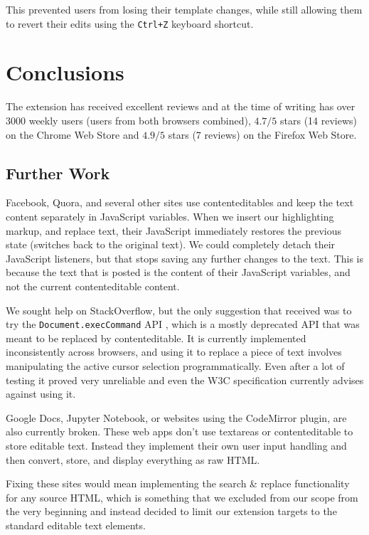 \documentclass[bsc,frontabs,twoside,singlespacing,parskip,deptreport]{infthesis}
\begin{document}
This prevented users from losing their template changes, while still allowing them to revert their edits using the \texttt{Ctrl+Z} keyboard shortcut.


\chapter{Conclusions}
The extension has received excellent reviews and at the time of writing has over 3000 weekly users (users from both browsers combined), $4.7/5$ stars (14 reviews) on the Chrome Web Store and $4.9/5$ stars (7 reviews) on the Firefox Web Store.

\section{Further Work}
Facebook, Quora, and several other sites use contenteditables and keep the text content separately in JavaScript variables. When we insert our highlighting markup, and replace text, their JavaScript immediately restores the previous state (switches back to the original text). We could completely detach their JavaScript listeners, but that stops saving any further changes to the text. This is because the text that is posted is the content of their JavaScript variables, and not the current contenteditable content.

We sought help on StackOverflow, but the only suggestion that received was to try the \texttt{Document.execCommand} API \cite{A10}, which is a mostly deprecated API that was meant to be replaced by contenteditable. It is currently implemented inconsistently across browsers, and using it to replace a piece of text involves manipulating the active cursor selection programmatically. Even after a lot of testing it proved very unreliable and even the W3C specification currently advises against using it.

Google Docs, Jupyter Notebook, or websites using the CodeMirror plugin, are also currently broken. These web apps don't use textareas or contenteditable to store editable text. Instead they implement their own user input handling and then convert, store, and display everything as raw HTML.

Fixing these sites would mean implementing the search \& replace functionality for any source HTML, which is something that we excluded from our scope from the very beginning and instead decided to limit our extension targets to the standard editable text elements.
\end{document}

